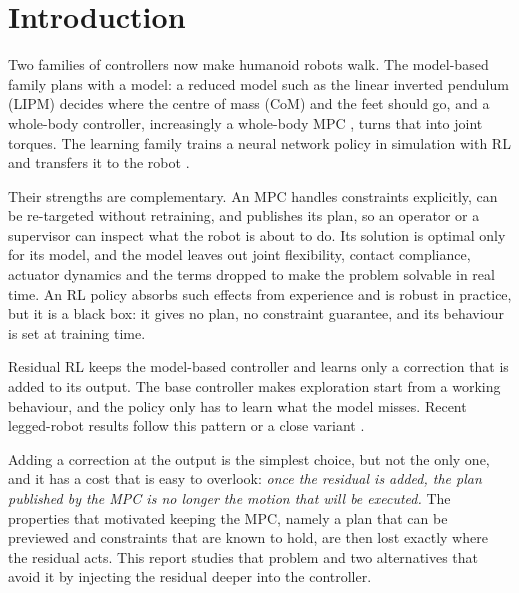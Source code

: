 \documentclass[conference]{IEEEtran}
\begin{document}
\section{Introduction}

Two families of controllers now make humanoid robots walk.
The model-based family plans with a model: a reduced model such as the linear inverted pendulum (LIPM) \cite{kajita2001lipm,kajita2003preview} decides where the centre of mass (CoM) and the feet should go, and a whole-body controller, increasingly a whole-body MPC \cite{tassa2012synthesis,mastalli2020crocoddyl,dantec2022wbmpc}, turns that into joint torques.
The learning family trains a neural network policy in simulation with RL and transfers it to the robot \cite{hwangbo2019learning,lee2020learning,rudin2022minutes,radosavovic2024humanoid}.

Their strengths are complementary.
An MPC handles constraints explicitly, can be re-targeted without retraining, and publishes its plan, so an operator or a supervisor can inspect what the robot is about to do.
Its solution is optimal only for its model, and the model leaves out joint flexibility, contact compliance, actuator dynamics and the terms dropped to make the problem solvable in real time.
An RL policy absorbs such effects from experience and is robust in practice, but it is a black box: it gives no plan, no constraint guarantee, and its behaviour is set at training time.

Residual RL \cite{silver2018residual,johannink2019residual} keeps the model-based controller and learns only a correction that is added to its output.
The base controller makes exploration start from a working behaviour, and the policy only has to learn what the model misses.
Recent legged-robot results follow this pattern or a close variant \cite{gangapurwala2022rloc,kang2023rlmodel,jenelten2024dtc,cheng2025rambo,jeon2025residualmpc}.

Adding a correction at the output is the simplest choice, but not the only one, and it has a cost that is easy to overlook: \emph{once the residual is added, the plan published by the MPC is no longer the motion that will be executed.}
The properties that motivated keeping the MPC, namely a plan that can be previewed and constraints that are known to hold, are then lost exactly where the residual acts.
This report studies that problem and two alternatives that avoid it by injecting the residual deeper into the controller.
\end{document}
